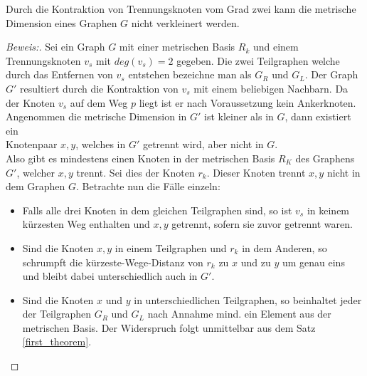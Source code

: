 \begin{lem}
\label{sepvertex2}
Durch die Kontraktion von Trennungsknoten vom Grad zwei kann die metrische Dimension eines Graphen $G$ nicht verkleinert werden.
\end{lem}
\begin{proof}[Beweis:]
Sei ein Graph $G$ mit einer metrischen Basis $R_k$ und einem Trennungsknoten $v_s$ mit $deg(v_s)=2$ gegeben. Die zwei Teilgraphen welche durch das Entfernen von $v_s$ entstehen bezeichne man als $G_R$ und $G_L$.
Der Graph $G'$ resultiert durch die Kontraktion von $v_s$ mit einem beliebigen Nachbarn. Da der Knoten $v_s$ auf dem Weg $p$ liegt ist er nach Voraussetzung kein Ankerknoten.\newline
Angenommen die metrische Dimension in $G'$ ist kleiner als in $G$, dann existiert ein\\Knotenpaar $x,y$, welches in $G'$ getrennt wird, aber nicht in $G$.\\Also gibt es mindestens einen Knoten in der metrischen Basis $R_K$ des Graphens $G'$, welcher $x,y$ trennt. Sei dies der Knoten $r_k$. Dieser Knoten trennt $x,y$ nicht in dem Graphen $G$. 
Betrachte nun die Fälle einzeln:
\begin{itemize}
\item Falls alle drei Knoten in dem gleichen Teilgraphen sind, so ist $v_s$ in keinem kürzesten Weg enthalten und $x,y$ getrennt, sofern sie zuvor getrennt waren.
\item Sind die Knoten $x,y$ in einem Teilgraphen und $r_k$ in dem Anderen, so schrumpft die kürzeste-Wege-Distanz von $r_k$ zu $x$ und zu $y$ um genau eins und bleibt dabei unterschiedlich auch in $G'$.
\item Sind die Knoten $x$ und $y$ in unterschiedlichen Teilgraphen, so beinhaltet jeder der Teilgraphen $G_R$ und $G_L$ nach Annahme mind. ein Element aus der metrischen Basis. Der Widerspruch folgt unmittelbar aus dem Satz \ref{first_theorem}.
\end{itemize}
\end{proof}
